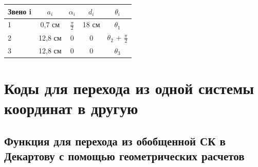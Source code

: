 \documentclass{article}
\begin{document}
\begin{tabular}{|l||c|c|c|c|}
\hline
Звено i & $a_i$ & $\alpha_i$ & $d_i$ & $\theta_i$\\
\hline
\hline
1 & 0,7 см & $\frac{\pi}2$ & 18 см & $\theta_1$  \\ \hline
2 & 12,8 см & 0 & 0 & $\theta_2$ + $\frac{\pi}2$ \\ \hline
3 & 12,8 см & 0 & 0 & $\theta_3$\\
\hline
\end{tabular}

\section{Коды для перехода из одной системы координат в другую}
\subsection{Функция для перехода из обобщенной СК в Декартову с помощью геометрических расчетов}
\end{document}
